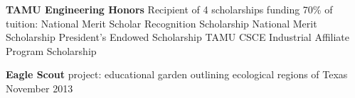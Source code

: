 \documentclass[12pt]{article}
\begin{document}
\begin{flushleft}
\begin{outline}[compactitem]
    \1 \textbf{TAMU Engineering Honors}
    \1 Recipient of 4 scholarships funding 70\% of tuition:
    \2 National Merit Scholar Recognition Scholarship
    \2 National Merit Scholarship
    \2 President's Endowed Scholarship
    \2 TAMU CSCE Industrial Affiliate Program Scholarship


    \1 \textbf{Eagle Scout} project: educational garden outlining ecological regions of Texas \hfill November 2013

  \end{outline}
\end{flushleft}
\end{document}
